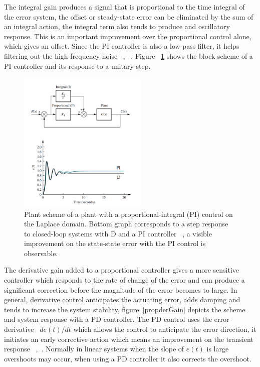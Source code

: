 The integral gain produces a signal that is proportional to the time integral of the error system, the offset or steady-state error can be eliminated by the sum of an integral action, the integral term also tends to produce and oscillatory response. This is an  important improvement over the proportional control alone, which gives an offset. Since the PI controller is also a low-pass filter, it helps filtering out the high-frequency noise  ~\cite[Chapter ~9]{Golnaraghi2010}, ~\cite[Chapter~ 5]{Ogata2009}. Figure ~\ref{PI} shows the block scheme of a PI controller and its response to a unitary step.
\smallskip

\begin{figure}[h]
	\centering
	\includegraphics[width=0.55\textwidth]{Chp2/PI_Dcomp.png}
	\caption{  Plant scheme of   a plant with  a proportional-integral (PI) control   on the Laplace domain. Bottom graph corresponds to a step response to closed-loop systems with D and a PI controller ~\cite[Chapter~ 9]{Nise}, a visible improvement on the state-state error with the PI control is observable.  \label{PI}}
\end{figure}

The derivative gain added to a proportional controller gives a more sensitive controller which responds to the rate of change of the error and can produce a significant correction before the magnitude of the error becomes to large. In general, derivative control anticipates the actuating error, adds damping  and tends to increase the system stability, figure~\ref{propderGain} depicts the scheme and system response with a PD controller. The PD control uses the error derivative ~$de(t)/dt$ which allows the control to anticipate the error direction, it initiates an early corrective action which means an improvement on the transient response   ~\cite[Chapter ~9]{Golnaraghi2010},~\cite[Chapter ~9]{Nise}. Normally in linear systems when the slope of $e(t)$ is large overshoots may occur, when using a PD controller it also corrects the overshoot. 
\smallskip

